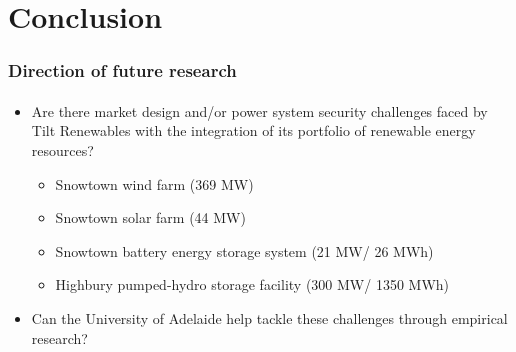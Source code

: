 \documentclass[presentation, smaller, table, svgnames]{beamer}
\begin{document}
\section{Conclusion}

\begin{frame}
	\frametitle{Direction of future research}
	\framesubtitle{}
	
	\begin{itemize}
		\item  Are there market design and/or power system security challenges faced by Tilt Renewables with the integration of its portfolio of renewable energy resources?
		\begin{itemize}
			\item  Snowtown wind farm (369 MW)
			\item  Snowtown solar farm (44 MW)
			\item  Snowtown battery energy storage system (21 MW/ 26 MWh)
			\item  Highbury pumped-hydro storage facility (300 MW/ 1350 MWh)
		\end{itemize}
		
		\item  Can the University of Adelaide help tackle these challenges through empirical research?

	\end{itemize}
	
\end{frame}

\end{document}
